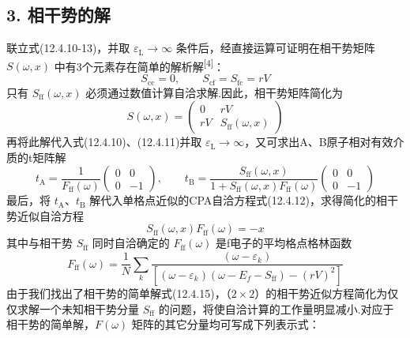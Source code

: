 \subsection*{3. 相干势的解}

联立式(12.4.10-13)，并取 $\varepsilon_{\mathrm{L}}\rightarrow\infty$ 条件后，经直接运算可证明在相干势矩阵 $S\left(\omega,x\right)$ 中有3个元素存在简单的解析解\textsuperscript{[4]}：
\begin{equation}
  S_{\mathrm{cc}}=0,\qquad S_{\mathrm{cf}}=S_{\mathrm{fc}}=rV
\end{equation}
只有 $S_{\mathrm{ff}}\left(\omega,x\right)$ 必须通过数值计算自洽求解.因此，相干势矩阵简化为
\begin{equation}
  S\left(\omega,x\right)=
  \begin{pmatrix}0 & rV\\ rV & S_{\mathrm{ff}}\left(\omega,x\right)\end{pmatrix}
\end{equation}
再将此解代入式(12.4.10)、(12.4.11)并取 $\varepsilon_{\mathrm{L}}\rightarrow\infty$，又可求出A、B原子相对有效介质的t矩阵解
\begin{equation}
  t_{\mathrm{A}}=\frac{1}{F_{\mathrm{ff}}\left(\omega\right)}
  \begin{pmatrix}0 & 0\\ 0 & -1\end{pmatrix},
  \qquad
  t_{\mathrm{B}}=\frac{S_{\mathrm{ff}}\left(\omega,x\right)}
  {1+S_{\mathrm{ff}}\left(\omega,x\right)F_{\mathrm{ff}}\left(\omega\right)}
  \begin{pmatrix}0 & 0\\ 0 & -1\end{pmatrix}
\end{equation}
最后，将 $t_{\mathrm{A}}$、$t_{\mathrm{B}}$ 解代入单格点近似的CPA自洽方程式(12.4.12)，求得简化的相干势近似自洽方程
\begin{equation}
  S_{\mathrm{ff}}\left(\omega,x\right)F_{\mathrm{ff}}\left(\omega\right)=-x
\end{equation}
其中与相干势 $S_{\mathrm{ff}}$ 同时自洽确定的 $F_{\mathrm{ff}}\left(\omega\right)$ 是f电子的平均格点格林函数
\begin{equation}
  F_{\mathrm{ff}}\left(\omega\right)=\frac{1}{N}\sum_{k}
  \frac{\left(\omega-\varepsilon_{k}\right)}
  {\left[\left(\omega-\varepsilon_{k}\right)\left(\omega-E_{f}-S_{\mathrm{ff}}\right)-\left(rV\right)^{2}\right]}
\end{equation}
由于我们找出了相干势的简单解式(12.4.15)，（$2\times2$）的相干势近似方程简化为仅仅求解一个未知相干势分量 $S_{\mathrm{ff}}$ 的问题，将使自洽计算的工作量明显减小.对应于相干势的简单解，$F\left(\omega\right)$ 矩阵的其它分量均可写成下列表示式：
